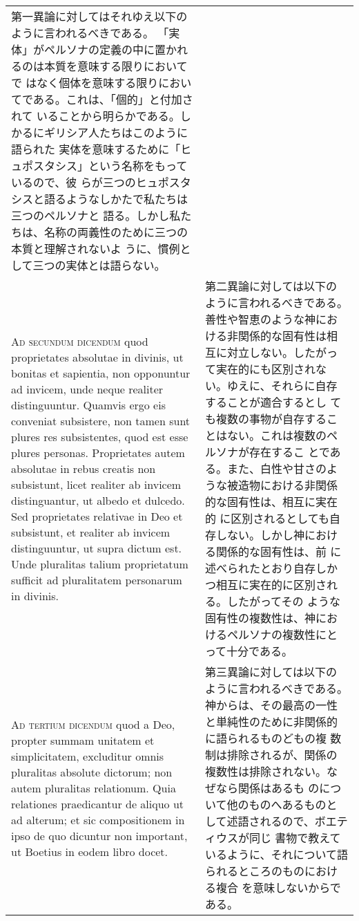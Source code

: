 \documentclass[10pt]{jsarticle} %
\begin{document}
\begin{longtable}{p{21em}p{21em}}
第一異論に対してはそれゆえ以下のように言われるべきである。
「実体」がペルソナの定義の中に置かれるのは本質を意味する限りにおいてで
 はなく個体を意味する限りにおいてである。これは、「個的」と付加されて
 いることから明らかである。しかるにギリシア人たちはこのように語られた
 実体を意味するために「ヒュポスタシス」という名称をもっているので、彼
 らが三つのヒュポスタシスと語るようなしかたで私たちは三つのペルソナと
 語る。しかし私たちは、名称の両義性のために三つの本質と理解されないよ
 うに、慣例として三つの実体とは語らない。


\\



{\scshape Ad secundum dicendum} quod proprietates absolutae in divinis, ut
bonitas et sapientia, non opponuntur ad invicem, unde neque realiter
distinguuntur. Quamvis ergo eis conveniat subsistere, non tamen sunt
plures res subsistentes, quod est esse plures personas. Proprietates
autem absolutae in rebus creatis non subsistunt, licet realiter ab
invicem distinguantur, ut albedo et dulcedo. Sed proprietates
relativae in Deo et subsistunt, et realiter ab invicem distinguuntur,
ut supra dictum est. Unde pluralitas talium proprietatum sufficit ad
pluralitatem personarum in divinis.


&

第二異論に対しては以下のように言われるべきである。
善性や智恵のような神における非関係的な固有性は相互に対立しない。したがっ
 て実在的にも区別されない。ゆえに、それらに自存することが適合するとし
 ても複数の事物が自存することはない。これは複数のペルソナが存在するこ
 とである。また、白性や甘さのような被造物における非関係的な固有性は、相互に実在的
 に区別されるとしても自存しない。しかし神における関係的な固有性は、前
 に述べられたとおり自存しかつ相互に実在的に区別される。したがってその
 ような固有性の複数性は、神におけるペルソナの複数性にとって十分である。


\\



{\scshape Ad tertium dicendum} quod a Deo, propter summam unitatem et
simplicitatem, excluditur omnis pluralitas absolute dictorum; non
autem pluralitas relationum. Quia relationes praedicantur de aliquo ut
ad alterum; et sic compositionem in ipso de quo dicuntur non
important, ut Boetius in eodem libro docet.


&

第三異論に対しては以下のように言われるべきである。
神からは、その最高の一性と単純性のために非関係的に語られるものどもの複
 数制は排除されるが、関係の複数性は排除されない。なぜなら関係はあるも
 のについて他のものへあるものとして述語されるので、ボエティウスが同じ
 書物で教えているように、それについて語られるところのものにおける複合
 を意味しないからである。



\end{longtable}
\end{document}
